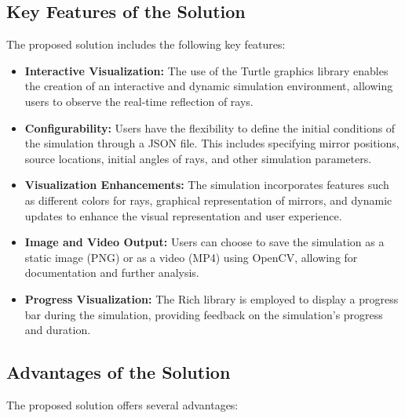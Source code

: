 \documentclass{article}
\begin{document}
\subsection{Key Features of the Solution}
The proposed solution includes the following key features:

\begin{itemize}
    \item \textbf{Interactive Visualization:} The use of the Turtle graphics library enables the creation of an interactive and dynamic simulation environment, allowing users to observe the real-time reflection of rays.
    
    \item \textbf{Configurability:} Users have the flexibility to define the initial conditions of the simulation through a JSON file. This includes specifying mirror positions, source locations, initial angles of rays, and other simulation parameters.
    
    \item \textbf{Visualization Enhancements:} The simulation incorporates features such as different colors for rays, graphical representation of mirrors, and dynamic updates to enhance the visual representation and user experience.
    
    \item \textbf{Image and Video Output:} Users can choose to save the simulation as a static image (PNG) or as a video (MP4) using OpenCV, allowing for documentation and further analysis.
    
    \item \textbf{Progress Visualization:} The Rich library is employed to display a progress bar during the simulation, providing feedback on the simulation's progress and duration.
\end{itemize}

\subsection{Advantages of the Solution}
The proposed solution offers several advantages:
\end{document}
